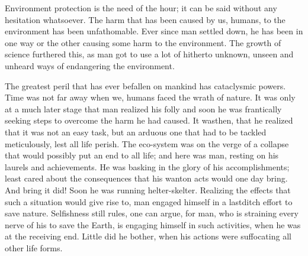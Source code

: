 \begin{multicols}{2}

\noi
Environment protection is the need of the hour; it can be said without any hesitation
whatsoever. The harm that has been caused by us, humans, to the environment has been
unfathomable. Ever since man settled down, he has been in one way or the other causing some
harm to the environment. The growth of science furthered this, as man got to use a lot of
hitherto unknown, unseen and unheard ways of endangering the environment.

\noi
The greatest peril that has ever befallen on mankind has cataclysmic powers. Time was not far
away when we, humans faced the wrath of nature. It was only at a much later stage that man 
realized his folly and soon he was frantically seeking steps to overcome the harm he had
caused. It wasthen, that he realized that it was not an easy task, but an arduous one that had to
be tackled meticulously, lest all life perish. The eco-system was on the verge of a collapse that
would possibly put an end to all life; and here was man, resting on his laurels and achievements.
He was basking in the glory of his accomplishments; least cared about the consequences that
his wanton acts would one day bring. And bring it did! Soon he was running helter-skelter.
Realizing the effects that such a situation would give rise to, man engaged himself in a lastditch effort to save nature. Selfishness still rules, one can argue, for man, who is straining every
nerve of his to save the Earth, is engaging himself in such activities, when he was at the
receiving end. Little did he bother, when his actions were suffocating all other life forms.


\end{multicols}
